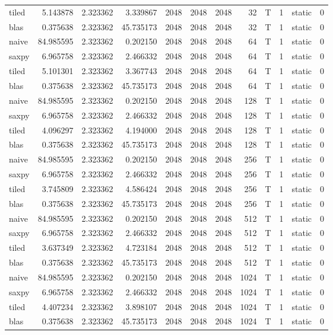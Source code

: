 \documentclass[
  12pt,
  xcolor = usenames,dvipsnames]{article}
\begin{document}
\begin{table}[!h]
{\begin{tabular}[t]{lrrrrrrrlrlr}
tiled & 5.143878 & 2.323362 & 3.339867 & 2048 & 2048 & 2048 & 32 & T & 1 & static & 0\\
blas & 0.375638 & 2.323362 & 45.735173 & 2048 & 2048 & 2048 & 32 & T & 1 & static & 0\\
naive & 84.985595 & 2.323362 & 0.202150 & 2048 & 2048 & 2048 & 64 & T & 1 & static & 0\\
\addlinespace
saxpy & 6.965758 & 2.323362 & 2.466332 & 2048 & 2048 & 2048 & 64 & T & 1 & static & 0\\
tiled & 5.101301 & 2.323362 & 3.367743 & 2048 & 2048 & 2048 & 64 & T & 1 & static & 0\\
blas & 0.375638 & 2.323362 & 45.735173 & 2048 & 2048 & 2048 & 64 & T & 1 & static & 0\\
naive & 84.985595 & 2.323362 & 0.202150 & 2048 & 2048 & 2048 & 128 & T & 1 & static & 0\\
saxpy & 6.965758 & 2.323362 & 2.466332 & 2048 & 2048 & 2048 & 128 & T & 1 & static & 0\\
\addlinespace
tiled & 4.096297 & 2.323362 & 4.194000 & 2048 & 2048 & 2048 & 128 & T & 1 & static & 0\\
blas & 0.375638 & 2.323362 & 45.735173 & 2048 & 2048 & 2048 & 128 & T & 1 & static & 0\\
naive & 84.985595 & 2.323362 & 0.202150 & 2048 & 2048 & 2048 & 256 & T & 1 & static & 0\\
saxpy & 6.965758 & 2.323362 & 2.466332 & 2048 & 2048 & 2048 & 256 & T & 1 & static & 0\\
tiled & 3.745809 & 2.323362 & 4.586424 & 2048 & 2048 & 2048 & 256 & T & 1 & static & 0\\
\addlinespace
blas & 0.375638 & 2.323362 & 45.735173 & 2048 & 2048 & 2048 & 256 & T & 1 & static & 0\\
naive & 84.985595 & 2.323362 & 0.202150 & 2048 & 2048 & 2048 & 512 & T & 1 & static & 0\\
saxpy & 6.965758 & 2.323362 & 2.466332 & 2048 & 2048 & 2048 & 512 & T & 1 & static & 0\\
tiled & 3.637349 & 2.323362 & 4.723184 & 2048 & 2048 & 2048 & 512 & T & 1 & static & 0\\
blas & 0.375638 & 2.323362 & 45.735173 & 2048 & 2048 & 2048 & 512 & T & 1 & static & 0\\
\addlinespace
naive & 84.985595 & 2.323362 & 0.202150 & 2048 & 2048 & 2048 & 1024 & T & 1 & static & 0\\
saxpy & 6.965758 & 2.323362 & 2.466332 & 2048 & 2048 & 2048 & 1024 & T & 1 & static & 0\\
tiled & 4.407234 & 2.323362 & 3.898107 & 2048 & 2048 & 2048 & 1024 & T & 1 & static & 0\\
blas & 0.375638 & 2.323362 & 45.735173 & 2048 & 2048 & 2048 & 1024 & T & 1 & static & 0\\
\bottomrule
\end{tabular}}
\end{table}
\end{document}
